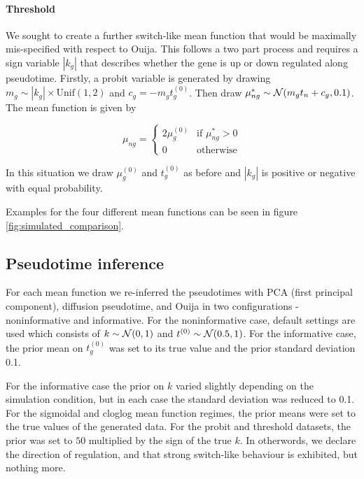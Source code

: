 \paragraph{Threshold}

We sought to create a further switch-like mean function that would be maximally mis-specified with respect to Ouija. This follows a two part process and requires a sign variable $|k_g|$ that describes whether the gene is up or down regulated along pseudotime. Firstly, a probit variable is generated by drawing $m_g \sim |k_g| \times \text{Unif}(1,2)$ and $c_g = -m_g t^{(0)}_g$. Then draw $\mu^*_{ng} \sim \mathcal{N}(m_g t_n + c_g, 0.1)$. The mean function is given by

\begin{equation}
    \mu_{ng} = 
    \begin{cases}
        2 \mu_g^{(0)} & \text{if } \mu^*_{ng} > 0 \\
        0 & \text{otherwise}
    \end{cases}
\end{equation}

In this situation we draw $ \mu_g^{(0)}$ and $t^{(0)}_{g}$ as before and $|k_g|$ is positive or negative with equal probability.

Examples for the four different mean functions can be seen in figure \ref{fig:simulated_comparison}.

\subsection{Pseudotime inference}

For each mean function we re-inferred the pseudotimes with PCA (first principal component), diffusion pseudotime, and Ouija in two configurations - noninformative and informative. For the noninformative case, default settings are used which consists of $k \sim \mathcal{N}(0, 1)$ and $t^{(0)} \sim \mathcal{N}(0.5, 1)$. For the informative case, the prior mean on $t^{(0)}_{g}$ was set to its true value and the prior standard deviation 0.1.

For the informative case the prior on $k$ varied slightly depending on the simulation condition, but in each case the standard deviation was reduced to 0.1. For the sigmoidal and cloglog mean function regimes, the prior means were set to the true values of the generated data. For the probit and threshold datasets, the prior was set to $50$ multiplied by the sign of the true $k$. In otherwords, we declare the direction of regulation, and that strong switch-like behaviour is exhibited, but nothing more.

